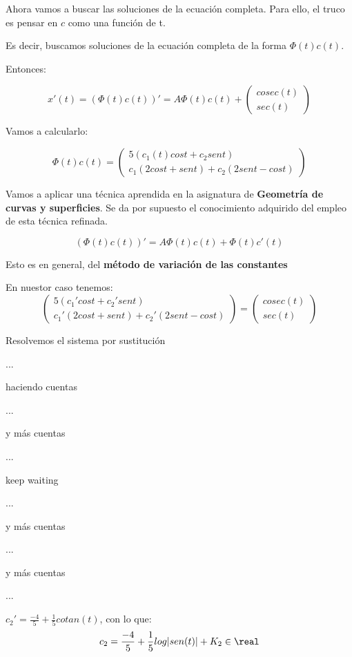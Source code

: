 \documentclass[nochap]{apuntes}
\begin{document}
\begin{problem}[31]
Ahora vamos a buscar las soluciones de la ecuación completa. Para ello, el truco es pensar en $c$ como una función de t.

Es decir, buscamos soluciones de la ecuación completa de la forma $\Phi(t)c(t)$.

Entonces: 

\[x'(t)= \left(\Phi(t)c(t)\right)' = A\Phi(t)c(t) + \begin{pmatrix}
cosec(t)\\sec(t)
\end{pmatrix}
\]

Vamos a calcularlo:

\[\Phi(t)c(t) = \begin{pmatrix}
5\left(c_1(t)cost + c_2sent\right)\\c_1(2cost+sent) + c_2(2sent-cost)
\end{pmatrix}\]

Vamos a aplicar una técnica aprendida en la asignatura de \textbf{Geometría de curvas y superficies}. Se da por supuesto el conocimiento adquirido del empleo de esta técnica refinada. 


\[\left(\Phi(t)c(t)\right)' = A\Phi(t)c(t) + \Phi(t)c'(t)\]

Esto es en general, del \textbf{método de variación de las constantes}

En nuestor caso tenemos:
\[\begin{pmatrix}
5(c_1'cost+c_2'sent)\\
c_1'(2cost + sent) + c_2'(2sent-cost)
\end{pmatrix} = \begin{pmatrix}
cosec(t)\\sec(t)
\end{pmatrix}\]

Resolvemos el sistema por sustitución

...

haciendo cuentas

...

y más cuentas

...

keep waiting

...

y más cuentas

...

y más cuentas

...

$\displaystyle c_2'=\frac{-4}{5} + \frac{1}{5}cotan(t)$, con lo que:
\[c_2 = \frac{-4}{5} + \frac{1}{5}log|sen(t)| + K_2\in\real\]


\end{problem}
\end{document}
